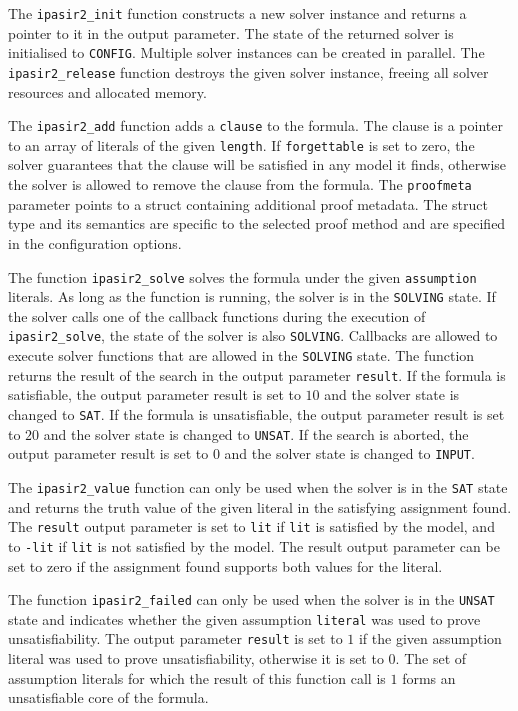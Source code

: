 \documentclass[sat]{iosart2x}
\begin{document}
The \texttt{ipasir2\_init} function constructs a new solver instance and returns a pointer to it in the output parameter.
The state of the returned solver is initialised to \texttt{CONFIG}.
Multiple solver instances can be created in parallel.
The \texttt{ipasir2\_release} function destroys the given solver instance, freeing all solver resources and allocated memory.

The \texttt{ipasir2\_add} function adds a \texttt{clause} to the formula.
The clause is a pointer to an array of literals of the given \texttt{length}.
If \texttt{forgettable} is set to zero, the solver guarantees that the clause will be satisfied in any model it finds, otherwise the solver is allowed to remove the clause from the formula.
The \texttt{proofmeta} parameter points to a struct containing additional proof metadata.
The struct type and its semantics are specific to the selected proof method and are specified in the configuration options.

The function \texttt{ipasir2\_solve} solves the formula under the given \texttt{assumption} literals.
As long as the function is running, the solver is in the \texttt{SOLVING} state.
If the solver calls one of the callback functions during the execution of \texttt{ipasir2\_solve}, the state of the solver is also \texttt{SOLVING}.
Callbacks are allowed to execute solver functions that are allowed in the \texttt{SOLVING} state.
The function returns the result of the search in the output parameter \texttt{result}.
If the formula is satisfiable, the output parameter result is set to $10$ and the solver state is changed to \texttt{SAT}.
If the formula is unsatisfiable, the output parameter result is set to $20$ and the solver state is changed to \texttt{UNSAT}.
If the search is aborted, the output parameter result is set to $0$ and the solver state is changed to \texttt{INPUT}.

The \texttt{ipasir2\_value} function can only be used when the solver is in the \texttt{SAT} state and returns the truth value of the given literal in the satisfying assignment found.
The \texttt{result} output parameter is set to \texttt{lit} if \texttt{lit} is satisfied by the model, and to \texttt{-lit} if \texttt{lit} is not satisfied by the model.
The result output parameter can be set to zero if the assignment found supports both values for the literal.

The function \texttt{ipasir2\_failed} can only be used when the solver is in the \texttt{UNSAT} state and indicates whether the given assumption \texttt{literal} was used to prove unsatisfiability.
The output parameter \texttt{result} is set to $1$ if the given assumption literal was used to prove unsatisfiability, otherwise it is set to $0$.
The set of assumption literals for which the result of this function call is $1$ forms an unsatisfiable core of the formula.
\end{document}
